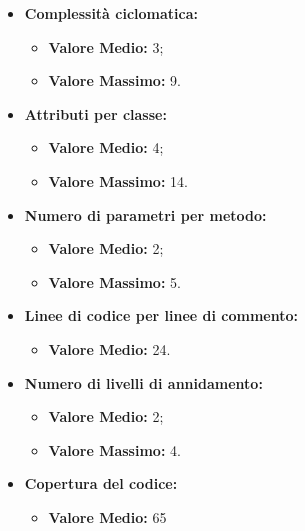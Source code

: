 \begin{itemize}

	\item \textbf{Complessità ciclomatica:}
	\begin{itemize}
		\item \textbf{Valore Medio:} 3;
		\item \textbf{Valore Massimo:} 9.
	\end{itemize}



	\item \textbf{Attributi per classe:}
	\begin{itemize}
		\item \textbf{Valore Medio:} 4;
		\item \textbf{Valore Massimo:} 14.
	\end{itemize}



	\item \textbf{Numero di parametri per metodo:}
	\begin{itemize}
		\item \textbf{Valore Medio:} 2;
		\item \textbf{Valore Massimo:} 5.
	\end{itemize}



	\item \textbf{Linee di codice per linee di commento:}
	\begin{itemize}
		\item \textbf{Valore Medio:} 24.
	\end{itemize}



	\item \textbf{Numero di livelli di annidamento:}
	\begin{itemize}
		\item \textbf{Valore Medio:} 2;
		\item \textbf{Valore Massimo:} 4.
	\end{itemize}



	\item \textbf{Copertura del codice:}
	\begin{itemize}
		\item \textbf{Valore Medio:} 65%
	\end{itemize}


\end{itemize}